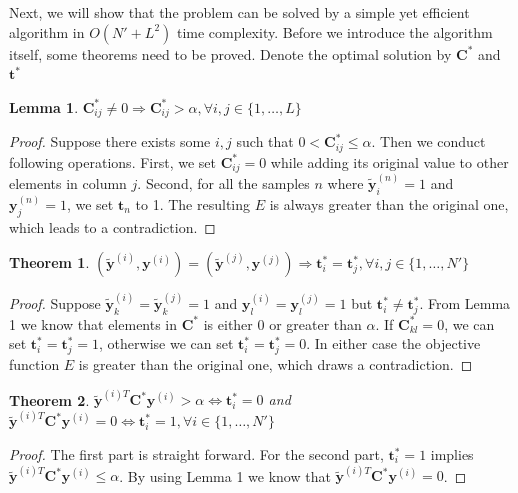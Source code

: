 \documentclass[10pt,twocolumn,letterpaper]{article}
\def\vec{\mathbf}
\def\mat{\mathbf}
\newtheorem{lemma}{Lemma}
\newtheorem{theorem}{Theorem}
\begin{document}
Next, we will show that the problem can be solved by a simple yet efficient algorithm in $O(N'+L^2)$ time complexity. Before we introduce the algorithm itself, some theorems need to be proved. Denote the optimal solution by $\mat{C}^*$ and $\vec{t}^*$
\begin{lemma}
$\mat{C}^*_{ij} \neq 0 \Rightarrow \mat{C}^*_{ij} > \alpha, \forall i,j \in \{1,\dots,L\}$
\end{lemma}
\begin{proof}
Suppose there exists some $i,j$ such that $0 < \mat{C}^*_{ij} \leq \alpha$. Then we conduct following operations. First, we set $\mat{C}^*_{ij}=0$ while adding its original value to other elements in column $j$. Second, for all the samples $n$ where $\tilde{\vec{y}}^{(n)}_i=1$ and $\vec{y}^{(n)}_j=1$, we set $\vec{t}_n$ to 1. The resulting $E$ is always greater than the original one, which leads to a contradiction.
\end{proof}
\begin{theorem}
$(\tilde{\vec{y}}^{(i)},\vec{y}^{(i)})=(\tilde{\vec{y}}^{(j)},\vec{y}^{(j)}) \Rightarrow \vec{t}^*_i=\vec{t}^*_j, \forall i,j \in \{1,\dots,N'\}$
\end{theorem}
\begin{proof}
Suppose $\tilde{\vec{y}}^{(i)}_k=\tilde{\vec{y}}^{(j)}_k=1$ and $\vec{y}^{(i)}_l=\vec{y}^{(j)}_l=1$ but $\vec{t}^*_i \neq \vec{t}^*_j$. From Lemma 1 we know that elements in $\mat{C}^*$ is either 0 or greater than $\alpha$. If $\mat{C}^*_{kl}=0$, we can set $\vec{t}^*_i=\vec{t}^*_j=1$, otherwise we can set $\vec{t}^*_i=\vec{t}^*_j=0$. In either case the objective function $E$ is greater than the original one, which draws a contradiction.
\end{proof}
\begin{theorem}
$\tilde{\vec{y}}^{(i)T} \mat{C}^* \vec{y}^{(i)} > \alpha \Leftrightarrow \vec{t}^*_i=0$ and $\tilde{\vec{y}}^{(i)T} \mat{C}^* \vec{y}^{(i)} = 0 \Leftrightarrow \vec{t}^*_i=1, \forall i \in \{1,\dots,N'\}$
\end{theorem}
\begin{proof}
The first part is straight forward. For the second part, $\vec{t}^*_i=1$ implies $\tilde{\vec{y}}^{(i)T} \mat{C}^* \vec{y}^{(i)} \leq \alpha$. By using Lemma 1 we know that $\tilde{\vec{y}}^{(i)T} \mat{C}^* \vec{y}^{(i)} = 0$.
\end{proof}
\end{document}
